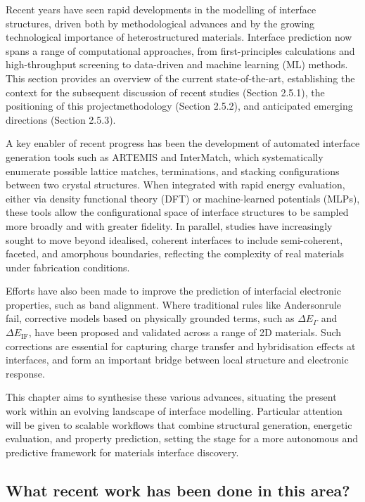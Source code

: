 Recent years have seen rapid developments in the modelling of interface structures, driven both by methodological advances and by the growing technological importance of heterostructured materials. Interface prediction now spans a range of computational approaches, from first-principles calculations and high-throughput screening to data-driven and machine learning (ML) methods. This section provides an overview of the current state-of-the-art, establishing the context for the subsequent discussion of recent studies (Section 2.5.1), the positioning of this project\rqss methodology (Section 2.5.2), and anticipated emerging directions (Section 2.5.3).

A key enabler of recent progress has been the development of automated interface generation tools such as ARTEMIS and InterMatch, which systematically enumerate possible lattice matches, terminations, and stacking configurations between two crystal structures. When integrated with rapid energy evaluation, either via density functional theory (DFT) or machine-learned potentials (MLPs), these tools allow the configurational space of interface structures to be sampled more broadly and with greater fidelity. In parallel, studies have increasingly sought to move beyond idealised, coherent interfaces to include semi-coherent, faceted, and amorphous boundaries, reflecting the complexity of real materials under fabrication conditions.

Efforts have also been made to improve the prediction of interfacial electronic properties, such as band alignment. Where traditional rules like Anderson\rqss rule fail, corrective models based on physically grounded terms, such as $\Delta E_{\Gamma}$ and $\Delta E_{\mathrm{IF}}$, have been proposed and validated across a range of 2D materials. Such corrections are essential for capturing charge transfer and hybridisation effects at interfaces, and form an important bridge between local structure and electronic response.

This chapter aims to synthesise these various advances, situating the present work within an evolving landscape of interface modelling. Particular attention will be given to scalable workflows that combine structural generation, energetic evaluation, and property prediction, setting the stage for a more autonomous and predictive framework for materials interface discovery.

\subsection{What recent work has been done in this area?}

